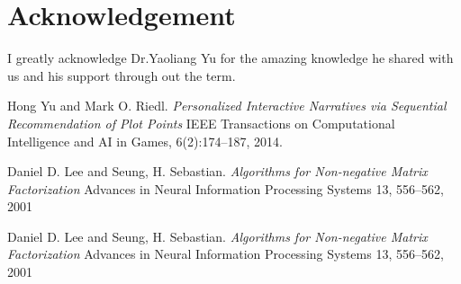 \documentclass[11pt]{article} %
\begin{document}
\section{Acknowledgement}
I greatly acknowledge Dr.Yaoliang Yu for the amazing knowledge he shared with us and his support through out the term.


\begin{thebibliography}{9}
Hong Yu and Mark O. Riedl.
\textit{Personalized Interactive Narratives via Sequential
Recommendation of Plot Points}
IEEE Transactions on Computational Intelligence and AI in Games, 6(2):174–187, 2014.

Daniel D. Lee and Seung, H. Sebastian.
\textit{Algorithms for Non-negative Matrix Factorization}
Advances in Neural Information Processing Systems 13, 556--562, 2001

Daniel D. Lee and Seung, H. Sebastian.
\textit{Algorithms for Non-negative Matrix Factorization}
Advances in Neural Information Processing Systems 13, 556--562, 2001

\end{thebibliography}
\end{document}
